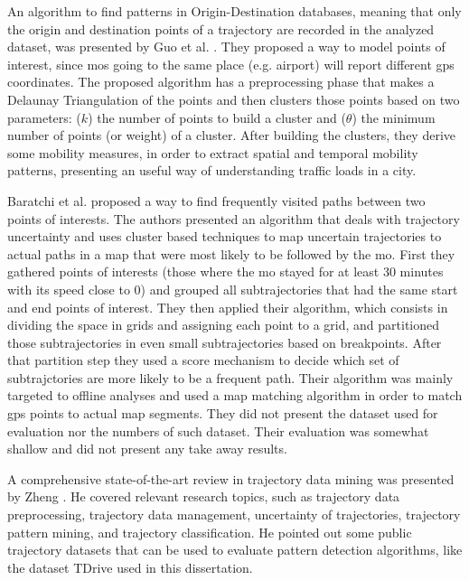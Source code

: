 An algorithm to find patterns in Origin-Destination databases, meaning that only the origin and destination points of a
trajectory are recorded in the analyzed dataset, was presented by Guo et al. \citep{discovering_orig_dest}. They
proposed a way to model points of interest, since \acp{mo} going to the same place (e.g. airport) will report different
\ac{gps} coordinates. The proposed algorithm has a preprocessing phase that makes a Delaunay Triangulation of the points
and then clusters those points based on two parameters: ($k$) the number of points to build a cluster and ($\theta$) the
minimum number of points (or weight) of a cluster. After building the clusters, they derive some mobility measures, in
order to extract spatial and temporal mobility patterns, presenting an useful way of understanding traffic loads in a
city.

Baratchi et al. \citep{uncertain2} proposed a way to find frequently visited paths between two points of interests. The
authors presented an algorithm that deals with trajectory uncertainty and uses cluster based techniques to map uncertain
trajectories to actual paths in a map that were most likely to be followed by the \ac{mo}. First they gathered points of
interests (those where the \ac{mo} stayed for at least 30 minutes with its speed close to 0) and grouped all
subtrajectories that had the same start and end points of interest. They then applied their algorithm, which consists in
dividing the space in grids and assigning each point to a grid, and partitioned those subtrajectories in even small
subtrajectories based on breakpoints.  After that partition step they used a score mechanism to decide which set of
subtrajctories are more likely to be a frequent path. Their algorithm was mainly targeted to offline analyses and used a
map matching algorithm in order to match \ac{gps} points to actual map segments. They did not present the dataset used
for evaluation nor the numbers of such dataset. Their evaluation was somewhat shallow and did not present any take away
results.

A comprehensive state-of-the-art review in trajectory data mining was presented by Zheng \citep{survey}. He covered
relevant research topics, such as trajectory data preprocessing, trajectory data management, uncertainty of
trajectories, trajectory pattern mining, and trajectory classification. He pointed out some public trajectory datasets
that can be used to evaluate pattern detection algorithms, like the dataset TDrive \citep{tdrive} used in this
dissertation.

